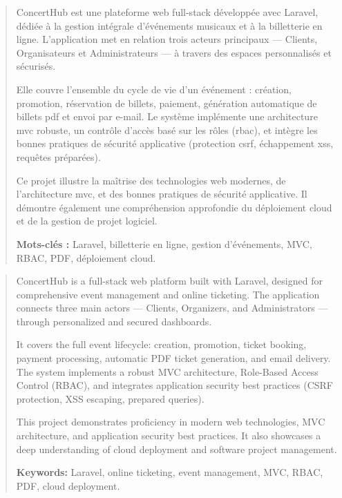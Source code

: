 \documentclass[a4paper,12pt,twoside]{report}
\begin{document}
\newpage
{}
\begin{abstract}

ConcertHub est une plateforme web full-stack développée avec Laravel, dédiée à la gestion intégrale d'événements musicaux et à la billetterie en ligne. L'application met en relation trois acteurs principaux --- Clients, Organisateurs et Administrateurs --- à travers des espaces personnalisés et sécurisés.

Elle couvre l'ensemble du cycle de vie d'un événement : création, promotion, réservation de billets, paiement, génération automatique de billets \gls{pdf} et envoi par e-mail. Le système implémente une architecture \gls{mvc} robuste, un contrôle d'accès basé sur les rôles (\gls{rbac}), et intègre les bonnes pratiques de sécurité applicative (protection \gls{csrf}, échappement \gls{xss}, requêtes préparées).

Ce projet illustre la maîtrise des technologies web modernes, de l'architecture \gls{mvc}, et des bonnes pratiques de sécurité applicative. Il démontre également une compréhension approfondie du déploiement cloud et de la gestion de projet logiciel.

\textbf{Mots-clés :} Laravel, billetterie en ligne, gestion d'événements, MVC, RBAC, PDF, déploiement cloud.

\end{abstract}

\newpage
{}
\begin{abstract}

ConcertHub is a full-stack web platform built with Laravel, designed for comprehensive event management and online ticketing. The application connects three main actors --- Clients, Organizers, and Administrators --- through personalized and secured dashboards.

It covers the full event lifecycle: creation, promotion, ticket booking, payment processing, automatic PDF ticket generation, and email delivery. The system implements a robust MVC architecture, Role-Based Access Control (RBAC), and integrates application security best practices (CSRF protection, XSS escaping, prepared queries).

This project demonstrates proficiency in modern web technologies, MVC architecture, and application security best practices. It also showcases a deep understanding of cloud deployment and software project management.

\textbf{Keywords:} Laravel, online ticketing, event management, MVC, RBAC, PDF, cloud deployment.

\end{abstract}
\end{document}
